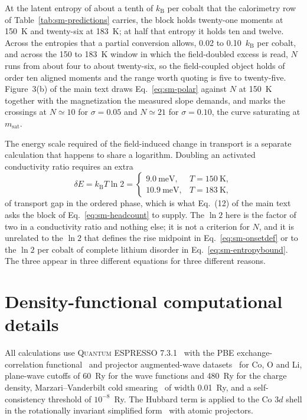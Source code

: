 \documentclass[reprint,twocolumn,prb,amsmath,amssymb,superscriptaddress,floatfix]{revtex4-2}
\newcommand{\kB}{k_{\mathrm{B}}}
\begin{document}
At the latent entropy of about a tenth of $\kB$ per cobalt that the calorimetry row of
Table~\ref{tab:sm-predictions} carries, the block holds twenty-one moments at 150~K and
twenty-six at 183~K;
at half that entropy it holds ten and twelve. Across the entropies that a partial conversion
allows, 0.02 to 0.10~$\kB$ per cobalt, and across the 150 to 183~K window in which the
field-doubled excess is read, $N$ runs from about four to about twenty-six, so the field-coupled
object holds of order ten aligned moments and the range worth quoting is five to twenty-five.
Figure~3(b) of the main text draws Eq.~\eqref{eq:sm-polar} against $N$ at
150~K together with the magnetization the measured slope demands, and marks the crossings at
$N\simeq10$ for $\sigma=0.05$ and $N\simeq21$ for $\sigma=0.10$, the curve saturating at
$m_{\mathrm{sat}}$.

The energy scale required of the field-induced change in transport is a separate calculation
that happens to share a logarithm. Doubling an activated conductivity ratio requires an extra
\begin{equation}
  \delta E = \kB T\ln 2 =
  \begin{cases}
    9.0\ \mathrm{meV}, & T=150\ \mathrm{K},\\
    10.9\ \mathrm{meV}, & T=183\ \mathrm{K},
  \end{cases}
  \label{eq:sm-gapshift}
\end{equation}
of transport gap in the ordered phase, which is what Eq.~(12) of the main text asks the block of
Eq.~\eqref{eq:sm-headcount} to supply. The $\ln2$ here is the factor of two in a conductivity
ratio and nothing else; it is not a criterion for $N$, and it is unrelated to the $\ln2$ that
defines the rise midpoint in Eq.~\eqref{eq:sm-onsetdef} or to the $\ln2$ per cobalt of complete
lithium disorder in Eq.~\eqref{eq:sm-entropybound}. The three appear in three different
equations for three different reasons.

\section{Density-functional computational details}
\label{sec:dftmethods}

All calculations use \textsc{Quantum ESPRESSO} 7.3.1~\cite{Giannozzi2009,Giannozzi2017} with
the PBE exchange-correlation functional~\cite{PBE1996} and projector augmented-wave
datasets~\cite{Blochl1994} for Co, O and Li, plane-wave cutoffs of 60~Ry for the wave functions
and 480~Ry for the charge density, Marzari--Vanderbilt cold smearing~\cite{Marzari1999} of width
0.01~Ry, and a self-consistency threshold of $10^{-8}$~Ry. The Hubbard term is applied to the Co
$3d$ shell in the rotationally invariant simplified form~\cite{Dudarev1998} with atomic
projectors.
\end{document}
